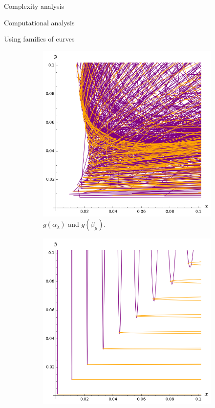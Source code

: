 \documentclass[11pt, a4paper, english, twoside, notitlepage, openright]{report}
\begin{document}
\begin{chapter}{Complexity analysis}
\begin{section}{Computational analysis}
\begin{subsection}{Using families of curves}
\begin{figure}
\hspace{0.4cm}
\begin{subfigure}{.45\linewidth}\centering
\includegraphics[width=1\textwidth]{plots/ch5_26_1curves4.png}
\vspace{-0.4cm}\caption{$g(\alpha_{\lambda})$ and $g(\beta_{\mu})$.\label{fig:1curves3}}
\end{subfigure}
\begin{subfigure}{.45\linewidth}\centering
\includegraphics[width=1\textwidth]{plots/ch5_30_3curves5.png}

\end{subfigure}
\end{figure}
\end{subsection}
\end{section}
\end{chapter}
\end{document}
